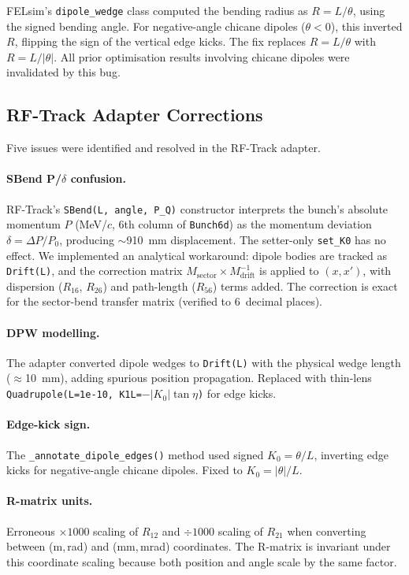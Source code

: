 \documentclass[11pt]{article}
\begin{document}
FELsim's \texttt{dipole\_wedge} class computed the bending radius as
$R = L/\theta$, using the signed bending angle.  For negative-angle
chicane dipoles ($\theta < 0$), this inverted $R$, flipping the sign
of the vertical edge kicks.  The fix replaces $R = L/\theta$ with
$R = L/|\theta|$.  All prior optimisation results involving chicane
dipoles were invalidated by this bug.


\subsection{RF-Track Adapter Corrections}

Five issues were identified and resolved in the RF-Track adapter.

\paragraph{SBend P/$\delta$ confusion.}
RF-Track's \texttt{SBend(L, angle, P\_Q)} constructor interprets the
bunch's absolute momentum $P$ (MeV/$c$, 6th column of \texttt{Bunch6d})
as the momentum deviation $\delta = \Delta P/P_0$, producing
$\sim$\SI{910}{mm} displacement.  The setter-only \texttt{set\_K0} has
no effect.  We implemented an analytical workaround: dipole bodies are
tracked as \texttt{Drift(L)}, and the correction matrix
$M_\text{sector} \times M_\text{drift}^{-1}$ is applied to $(x, x')$,
with dispersion ($R_{16}$, $R_{26}$) and path-length ($R_{56}$) terms
added.  The correction is exact for the sector-bend transfer matrix
(verified to 6~decimal places).

\paragraph{DPW modelling.}
The adapter converted dipole wedges to \texttt{Drift(L)} with the
physical wedge length ($\approx$\SI{10}{mm}), adding spurious position
propagation.  Replaced with thin-lens \texttt{Quadrupole(L=1e-10,
K1L=$-|K_0|\tan\eta$)} for edge kicks.

\paragraph{Edge-kick sign.}
The \texttt{\_annotate\_dipole\_edges()} method used signed
$K_0 = \theta/L$, inverting edge kicks for negative-angle chicane
dipoles.  Fixed to $K_0 = |\theta|/L$.

\paragraph{R-matrix units.}
Erroneous $\times 1000$ scaling of $R_{12}$ and $\div 1000$ scaling of
$R_{21}$ when converting between (m,\,rad) and (mm,\,mrad) coordinates.
The R-matrix is invariant under this coordinate scaling because both
position and angle scale by the same factor.
\end{document}

